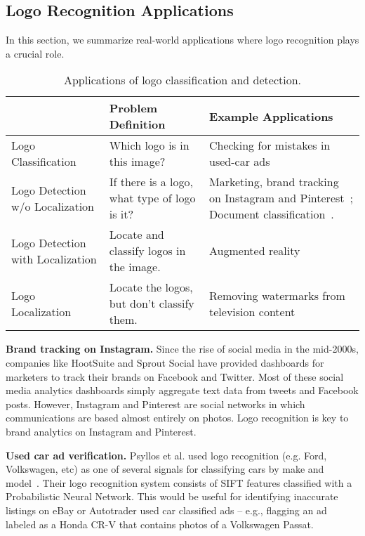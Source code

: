 \documentclass{bmvc2k}
\begin{document}
    
\subsection{Logo Recognition Applications}
\vspace{-0.1in}
\label{sec:applications}
In this section, we summarize real-world applications where logo recognition plays a crucial role.

\begin{table}[htb]
	\footnotesize
	\caption{Applications of logo classification and detection.}
	\label{T:applications}
	\centering
	\begin{tabular}{|p{2.5cm}|p{4cm}|p{4cm}|}
		\hline
		& Problem Definition                                   & Example Applications  \\ \hline
		Logo Classification                      & Which logo is in this image?                    & Checking for mistakes in used-car ads~\cite{Psyllos2011} \\ \hline
		Logo Detection w/o Localization  & If there is a logo, what type of logo is it? & Marketing, brand tracking on Instagram and Pinterest~\cite{Ditto}; Document classification~\cite{Guangyu2007}.  \\ \hline
		Logo Detection with Localization & Locate and classify logos in the image.   & Augmented reality~\cite{LogoGrab}  \\ \hline
		Logo Localization                        & Locate the logos, but don't classify them. & Removing watermarks from television content~\cite{duffner2006}~~\cite{Yan2005} \\ \hline
	\end{tabular}
\end{table}

{\bf Brand tracking on Instagram.} Since the rise of social media in the mid-2000s, companies like HootSuite and Sprout Social have provided dashboards for marketers to track their brands on Facebook and Twitter.
Most of these social media analytics dashboards simply aggregate text data from tweets and Facebook posts.
However, Instagram and Pinterest are social networks in which communications are based almost entirely on photos.
Logo recognition is key to brand analytics on Instagram and Pinterest.

{\bf Used car ad verification.} Psyllos et al. used logo recognition (e.g. Ford, Volkswagen, etc) as one of several signals for classifying cars by make and model~\cite{Psyllos2011}. 
Their logo recognition system consists of SIFT features classified with a Probabilistic Neural Network. 
This would be useful for identifying inaccurate listings on eBay or Autotrader used car classified ads -- e.g., flagging an ad labeled as a Honda CR-V that contains photos of a Volkswagen Passat.
\end{document}
